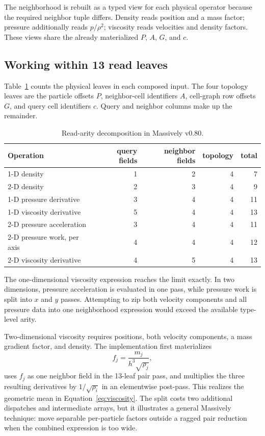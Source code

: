 \documentclass[a4paper,10pt]{article}
\begin{document}
The neighborhood is rebuilt as a typed view for each physical operator because
the required neighbor tuple differs.  Density reads position and a mass factor;
pressure additionally reads $p/\rho^2$; viscosity reads velocities and density
factors.  These views share the already materialized $P$, $A$, $G$, and $c$.

\subsection{Working within 13 read leaves}

Table~\ref{tab:arity} counts the physical leaves in each composed input.  The
four topology leaves are the particle offsets $P$, neighbor-cell identifiers
$A$, cell-graph row offsets $G$, and query cell identifiers $c$.  Query and
neighbor columns make up the remainder.

\begin{table}[ht]
  \centering
  \caption{Read-arity decomposition in Massively v0.80.}
  \label{tab:arity}
  \begin{tabular}{lrrrr}
    \toprule
    Operation & query fields & neighbor fields & topology & total \\
    \midrule
    1-D density                  & 1 & 2 & 4 & 7 \\
    2-D density                  & 2 & 3 & 4 & 9 \\
    1-D pressure derivative      & 3 & 4 & 4 & 11 \\
    1-D viscosity derivative     & 5 & 4 & 4 & 13 \\
    2-D pressure acceleration    & 3 & 4 & 4 & 11 \\
    2-D pressure work, per axis  & 4 & 4 & 4 & 12 \\
    2-D viscosity derivative     & 4 & 5 & 4 & 13 \\
    \bottomrule
  \end{tabular}
\end{table}

The one-dimensional viscosity expression reaches the limit exactly.  In two
dimensions, pressure acceleration is evaluated in one pass, while pressure work
is split into $x$ and $y$ passes.  Attempting to zip both velocity components and
all pressure data into one neighborhood expression would exceed the available
type-level arity.

Two-dimensional viscosity requires positions, both velocity components, a mass
gradient factor, and density.  The implementation first materializes
\begin{equation}
 f_j=\frac{m_j}{h^3\sqrt{\rho_j}},
\end{equation}
uses $f_j$ as one neighbor field in the 13-leaf pair pass, and multiplies the
three resulting derivatives by $1/\sqrt{\rho_i}$ in an elementwise post-pass.
This realizes the geometric mean in Equation~\eqref{eq:viscosity}.  The split
costs two additional dispatches and intermediate arrays, but it illustrates a
general Massively technique: move separable per-particle factors outside a
ragged pair reduction when the combined expression is too wide.
\end{document}
